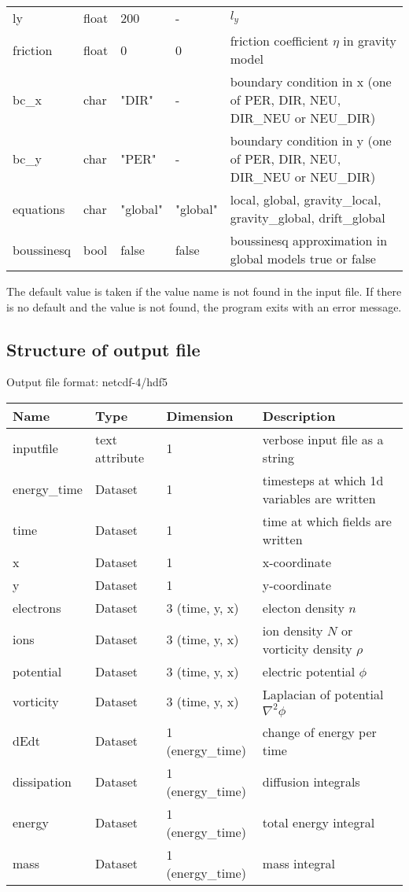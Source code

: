 \documentclass{hitec}
\begin{document}
\begin{longtable}{llll>{\RaggedRight}p{7cm}}
ly         & float &200    & - & $l_y$  \\
friction   & float & 0     & 0 & friction coefficient $\eta$ in gravity model \\
bc\_x   & char & "DIR"      & - & boundary condition in x (one of PER, DIR, NEU, DIR\_NEU or NEU\_DIR) \\
bc\_y   & char & "PER"      & - & boundary condition in y (one of PER, DIR, NEU, DIR\_NEU or NEU\_DIR) \\
equations  & char & "global" & "global" &local, global, gravity\_local, gravity\_global, drift\_global \\
boussinesq & bool & false    & false &boussinesq approximation in global models true or false\\
\bottomrule
\end{longtable}

The default value is taken if the value name is not found in the input file. If there is no default and
the value is not found,
the program exits with an error message.

\subsection{Structure of output file}
Output file format: netcdf-4/hdf5
%
\begin{longtable}{lll>{\RaggedRight}p{7cm}}
\toprule
\rowcolor{gray!50}\textbf{Name} &  \textbf{Type} & \textbf{Dimension} & \textbf{Description}  \\ \midrule
inputfile  &             text attribute & 1 & verbose input file as a string \\
energy\_time             & Dataset & 1 & timesteps at which 1d variables are written \\
time                     & Dataset & 1 & time at which fields are written \\
x                        & Dataset & 1 & x-coordinate  \\
y                        & Dataset & 1 & y-coordinate \\
electrons                & Dataset & 3 (time, y, x) & electon density $n$ \\
ions                     & Dataset & 3 (time, y, x) & ion density $N$ or vorticity density $\rho$  \\
potential                & Dataset & 3 (time, y, x) & electric potential $\phi$  \\
vorticity                & Dataset & 3 (time, y, x) & Laplacian of potential $\nabla^2\phi$  \\
dEdt                     & Dataset & 1 (energy\_time) & change of energy per time  \\
dissipation              & Dataset & 1 (energy\_time) & diffusion integrals  \\
energy                   & Dataset & 1 (energy\_time) & total energy integral  \\
mass                     & Dataset & 1 (energy\_time) & mass integral   \\
\bottomrule
\end{longtable}
\end{document}
